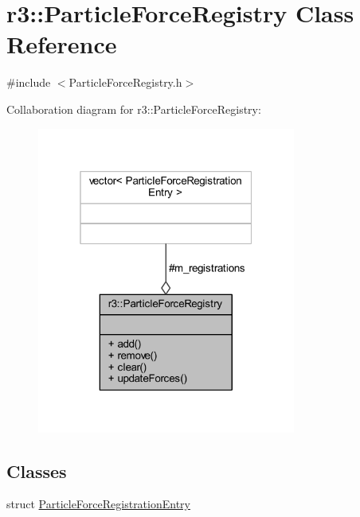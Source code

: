 \hypertarget{classr3_1_1_particle_force_registry}{}\section{r3\+:\+:Particle\+Force\+Registry Class Reference}
\label{classr3_1_1_particle_force_registry}


{\ttfamily \#include $<$Particle\+Force\+Registry.\+h$>$}



Collaboration diagram for r3\+:\+:Particle\+Force\+Registry\+:\nopagebreak
\begin{figure}[H]
\begin{center}
\leavevmode
\includegraphics[width=241pt]{classr3_1_1_particle_force_registry__coll__graph}
\end{center}
\end{figure}
\subsection*{Classes}
\begin{DoxyCompactItemize}
\item 
struct \mbox{\hyperlink{structr3_1_1_particle_force_registry_1_1_particle_force_registration_entry}{Particle\+Force\+Registration\+Entry}}
\end{DoxyCompactItemize}
